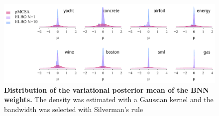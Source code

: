 \newpage
\begin{figure}[H]
  \vspace{-0.10in}
  \centering
  \includegraphics[scale=0.9]{figures/pruning_02.pdf}
  \vspace{-0.05in}
  \caption{\textbf{
      Distribution of the variational posterior mean of the BNN weights.
    }
    The density was estimated with a Gaussian kernel and the bandwidth was selected with Silverman's rule
  }\label{fig:pruning_additional}
\end{figure}


